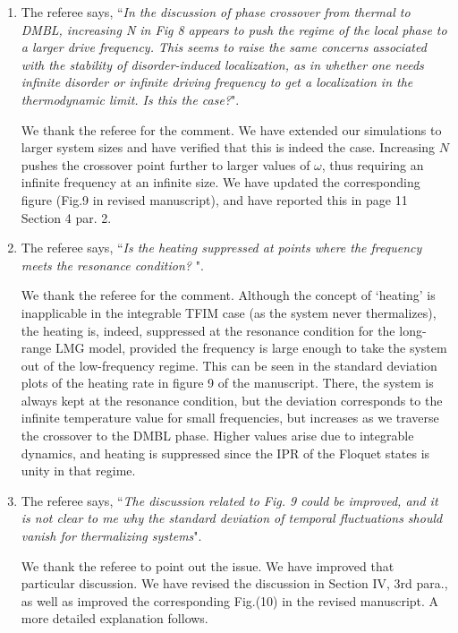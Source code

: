 \documentclass[aps,prb,reprint,showpacs,floatfix,superscriptaddress, onecolumn, nofootinbib, 9pt]{revtex4-2}
\newcommand{\response}[1]{{\color{black}#1}} %
\newcommand{\comment}[1]{{\color{blue}#1}} %
\begin{document}
\begin{enumerate}
		\item The referee says, \comment{``\textit{In the discussion of phase crossover from thermal to DMBL, increasing N in Fig 8 appears to push the regime of the local phase to a larger drive frequency. This seems to raise the same concerns associated with the stability of disorder-induced localization, as in whether one needs infinite disorder or infinite driving frequency to get a localization in the thermodynamic limit. Is this the case?}"}.
		
		\response{    	
			We thank the referee for the comment. We have extended our simulations to larger system sizes and have verified that this is indeed the case. Increasing $N$ pushes the crossover point further to larger values of $\omega$, thus requiring an infinite frequency at an infinite size. We have updated the corresponding figure (Fig.9 in revised manuscript), and have reported this in page 11 Section 4 par. 2.
		}
		\item The referee says, \comment{``\textit{Is the heating suppressed at points where the frequency meets the resonance condition? }"}.
		
		\response{
			We thank the referee for the comment. Although the concept of `heating' is inapplicable in the integrable TFIM case (as the system never thermalizes), the heating is, indeed, suppressed at the resonance condition for the long-range LMG model, provided the frequency is large enough to take the system out of the low-frequency regime. This can be seen in the standard deviation plots of the heating rate in figure 9 of the manuscript. There, the system is always kept at the resonance condition, but the deviation corresponds to the infinite temperature value for small frequencies, but increases as we traverse the crossover to the DMBL phase. Higher values arise due to integrable dynamics, and heating is suppressed since the IPR of the Floquet states is unity in that regime.}
		
		\item The referee says, \comment{``\textit{The discussion related to Fig. 9 could be improved, and it is not clear to me why the standard deviation of temporal fluctuations should vanish for thermalizing systems}"}.\\
		
		\response{ We thank the referee to point out the issue. We have improved that particular discussion. We have revised the discussion in Section IV, 3rd para., as well as improved the corresponding Fig.(10) in the revised manuscript. A more detailed explanation follows.
			
}
\end{enumerate}
\end{document}
